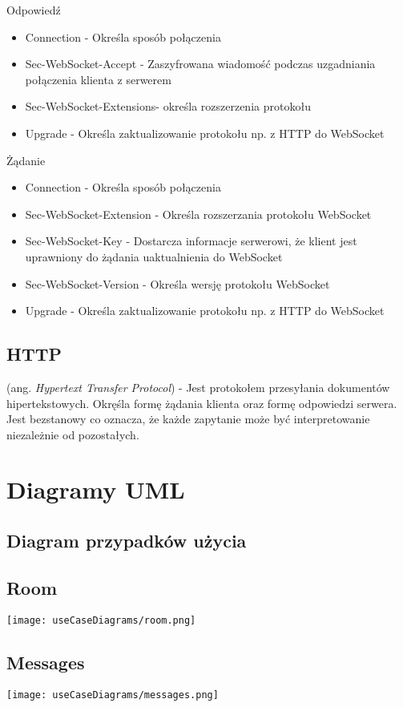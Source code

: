 \documentclass{article}
\begin{document}
Odpowiedź
\begin{itemize}
  \item Connection - Określa sposób połączenia
  \item Sec-WebSocket-Accept - Zaszyfrowana wiadomość podczas uzgadniania połączenia klienta z serwerem
  \item Sec-WebSocket-Extensions- określa rozszerzenia protokołu
  \item Upgrade - Określa zaktualizowanie protokołu np. z HTTP do WebSocket
\end{itemize}

Żądanie
\begin{itemize}
  \item Connection - Określa sposób połączenia
  \item Sec-WebSocket-Extension - Określa rozszerzania protokołu WebSocket
  \item Sec-WebSocket-Key - Dostarcza informacje serwerowi, że klient jest uprawniony do żądania uaktualnienia do WebSocket
  \item Sec-WebSocket-Version - Określa wersję protokołu WebSocket
  \item Upgrade - Określa zaktualizowanie protokołu np. z HTTP do WebSocket
\end{itemize}

\subsection{HTTP}
(ang. \emph{Hypertext Transfer Protocol}) - Jest protokołem przesyłania dokumentów hipertekstowych. Okręśla formę żądania klienta oraz formę odpowiedzi serwera. Jest bezstanowy co oznacza, że każde zapytanie może być interpretowanie niezależnie od pozostałych.

\section{Diagramy UML}

\subsection{Diagram przypadków użycia}

\subsection{Room}
\texttt{[image: useCaseDiagrams/room.png]}

\subsection{Messages}
\texttt{[image: useCaseDiagrams/messages.png]}
\end{document}
